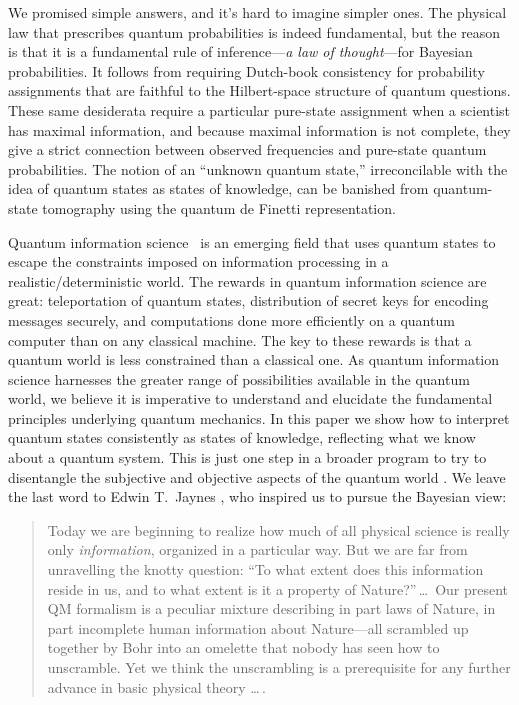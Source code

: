 We promised simple answers, and it's hard to imagine simpler ones.
The physical law that prescribes quantum probabilities is indeed
fundamental, but the reason is that it is a fundamental rule of
inference---{\it a law of thought}---for Bayesian probabilities.  It
follows from requiring Dutch-book consistency for probability
assignments that are faithful to the Hilbert-space structure of
quantum questions.  These same desiderata require a particular
pure-state assignment when a scientist has maximal information, and
because maximal information is not complete, they give a strict
connection between observed frequencies and pure-state quantum
probabilities.  The notion of an ``unknown quantum state,''
irreconcilable with the idea of quantum states as states of
knowledge, can be banished from quantum-state tomography using the
quantum de Finetti representation.

Quantum information science~\cite{NatureReview} is an emerging field
that uses quantum states to escape the constraints imposed on
information processing in a realistic/determin\-is\-tic world.  The
rewards in quantum information science are great: teleportation of
quantum states, distribution of secret keys for encoding messages
securely, and computations done more efficiently on a quantum
computer than on any classical machine.  The key to these rewards is
that a quantum world is less constrained than a classical one.  As
quantum information science harnesses the greater range of
possibilities available in the quantum world, we believe it is
imperative to understand and elucidate the fundamental principles
underlying quantum mechanics. In this paper we show how to interpret
quantum states consistently as states of knowledge, reflecting what
we know about a quantum system.  This is just one step in a broader
program to try to disentangle the subjective and objective aspects of
the quantum world \cite{Fuchs01}.  We leave the last word to Edwin
T.~Jaynes \cite{Jaynes1990a}, who inspired us to pursue the Bayesian
view:

\begin{quotation}
Today we are beginning to realize how much of all physical science is
really only {\it information}, organized in a particular way.  But we
are far from unravelling the knotty question: ``To what extent does
this information reside in us, and to what extent is it a property of
Nature?''\,\dots\ Our present QM formalism is a peculiar mixture
describing in part laws of Nature, in part incomplete human
information about Nature---all scrambled up together by Bohr into an
omelette that nobody has seen how to unscramble.  Yet we think the
unscrambling is a prerequisite for any further advance in basic
physical theory \dots\,.
\end{quotation}

